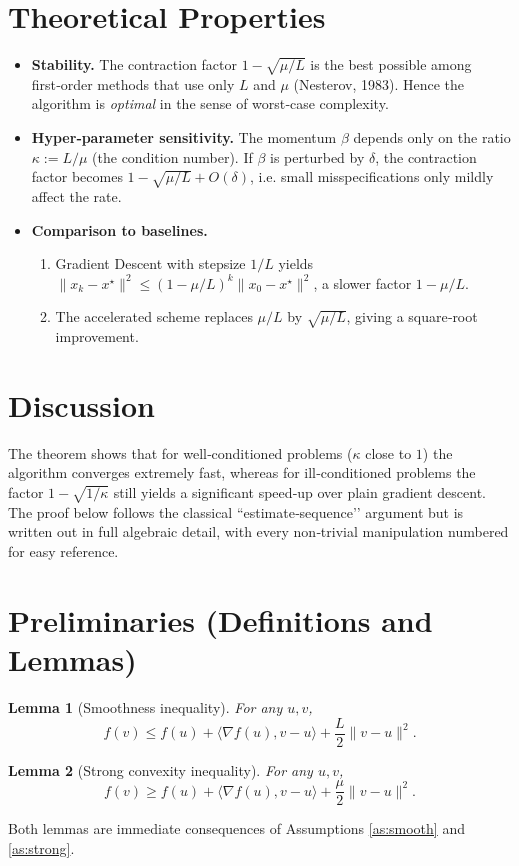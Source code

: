 \documentclass{article}
\newtheorem{lemma}{Lemma}
\begin{document}
\section*{Theoretical Properties}
\begin{itemize}
\item \textbf{Stability.} The contraction factor $1-\sqrt{\mu/L}$ is the best possible among first‑order methods that use only $L$ and $\mu$ (Nesterov, 1983). Hence the algorithm is \emph{optimal} in the sense of worst‑case complexity.
\item \textbf{Hyper‑parameter sensitivity.} The momentum $\beta$ depends only on the ratio $\kappa:=L/\mu$ (the condition number). If $\beta$ is perturbed by $\delta$, the contraction factor becomes $1-\sqrt{\mu/L}+O(\delta)$, i.e. small misspecifications only mildly affect the rate.
\item \textbf{Comparison to baselines.}
    \begin{enumerate}
        \item Gradient Descent with stepsize $1/L$ yields $\|x_k-x^\star\|^2\le(1-\mu/L)^k\|x_0-x^\star\|^2$, a slower factor $1-\mu/L$.
        \item The accelerated scheme replaces $\mu/L$ by $\sqrt{\mu/L}$, giving a square‑root improvement.
    \end{enumerate}
\end{itemize}

\section*{Discussion}
The theorem shows that for well‑conditioned problems ($\kappa$ close to $1$) the algorithm converges extremely fast, whereas for ill‑conditioned problems the factor $1-\sqrt{1/\kappa}$ still yields a significant speed‑up over plain gradient descent. The proof below follows the classical ``estimate‑sequence’’ argument but is written out in full algebraic detail, with every non‑trivial manipulation numbered for easy reference.

\newpage
\section*{Preliminaries (Definitions and Lemmas)}
\begin{lemma}[Smoothness inequality]\label{lem:smooth}
For any $u,v$,
\[
f(v)\le f(u)+\langle\nabla f(u),v-u\rangle+\frac{L}{2}\|v-u\|^2 .
\tag{9}
\]
\end{lemma}
\begin{lemma}[Strong convexity inequality]\label{lem:strong}
For any $u,v$,
\[
f(v)\ge f(u)+\langle\nabla f(u),v-u\rangle+\frac{\mu}{2}\|v-u\|^2 .
\tag{10}
\]
\end{lemma}
Both lemmas are immediate consequences of Assumptions \ref{as:smooth} and \ref{as:strong}.
\end{document}
